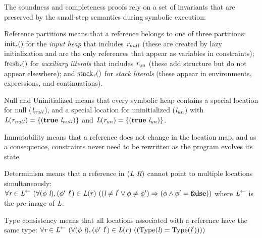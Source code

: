 The soundness and completeness proofs  rely on a set of 
invariants  that
are preserved by the small-step semantics during symbolic execution:
\begin{compactdesc}
\item[Reference partitions] means that a reference belongs to one of three partitions: $\mathrm{init}_{\emph{r}}()$ for the \emph{input
  heap} that includes $\emph{r}_\mathit{null}$ (these are created by lazy initialization and are the only references that appear as variables in
  constraints); $\mathrm{fresh}_{\emph{r}}()$ for \emph{auxiliary
  literals} that includes $\emph{r}_\mathit{un}$ (these add structure but do not appear elsewhere); and $\mathrm{stack}_{\emph{r}}()$ for \emph{stack
  literals} (these appear in environments, expressions, and continuations).
\item[Null and Uninitialized] means that every symbolic heap contains 
a special location for null ($\emph{l}_\mathit{null}$), and a special
location for uninitialized
  ($\emph{l}_\mathit{un}$) with $\emph{L}(\emph{r}_\mathit{null}) =
  \{(\textbf{true}\ \emph{l}_\mathit{null})\}$ and
  $\emph{L}(\emph{r}_\mathit{un}) =
  \{(\textbf{true}\ \emph{l}_\mathit{un})\}$. 
\item[Immutability] means that a reference does not change in the
location map, and as a consequence, constraints never need to be
rewritten as the program evolves its state.
\item[Determinism] means that a reference in $(\emph{L}\ \emph{R})$ cannot point to multiple locations simultaneously: 
$
\forall \cfgnt{r} \in \cfgnt{L}^\leftarrow\ (\forall (\phi\ \cfgnt{l}),(\phi^\prime\ \cfgnt{l}^\prime) \in \cfgnt{L}(r)\ (
(\cfgnt{l} \neq \cfgnt{l}^\prime \vee \phi \neq \phi^\prime) \Rightarrow (\phi \wedge \phi^\prime = \cfgt{false}))
$
where $\emph{L}^\leftarrow$ is the pre-image of $\emph{L}$. 
\item[Type consistency] means that all locations associated with a reference have the same type:
$\forall \cfgnt{r} \in \cfgnt{L}^\leftarrow\ (\forall (\phi\ \cfgnt{l}),(\phi^\prime\ \cfgnt{l}^\prime) \in \cfgnt{L}(r)\ (
(\mathrm{Type}\lp\cfgnt{l}\rp = \mathrm{Type}\lp\cfgnt{l}^\prime\rp)))$

\end{compactdesc}

